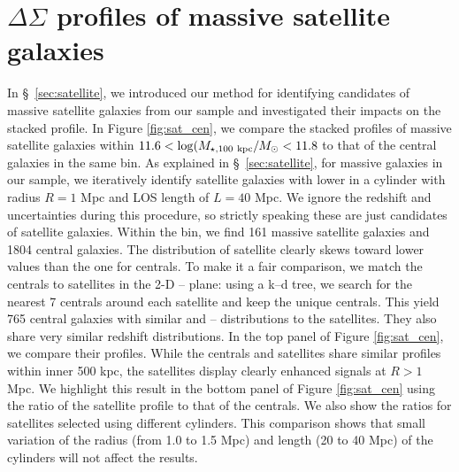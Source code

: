 \documentclass[fleqn,usenatbib,useAMS]{mnras}
\begin{document}
\section{\texorpdfstring{$\Delta\Sigma$}{DSigma} profiles of massive satellite galaxies}
	\label{app:sat_cen}

    In \S\ \ref{sec:satellite}, we introduced our method for identifying candidates of massive
    satellite galaxies from our sample and investigated their impacts on the stacked \dsigma{}
    profile.
    In Figure \ref{fig:sat_cen}, we compare the stacked \dsigma{} profiles of massive satellite
    galaxies within $11.6 < \log (M_{\star, 100\ \rm kpc}/M_{\odot} < 11.8$ to that of the central 
    galaxies in the same \mstar{} bin.
    As explained in \S\ \ref{sec:satellite}, for massive galaxies in our sample, we iteratively
    identify satellite galaxies with lower  in a cylinder with radius $R=1$ Mpc and LOS
    length of $L=40$ Mpc.
    We ignore the redshift and \mstar{} uncertainties during this procedure, so strictly speaking 
    these are just candidates of satellite galaxies.
    Within the  bin, we find 161 massive satellite galaxies and 1804 central galaxies.
    The  distribution of satellite clearly skews toward lower values than the one
    for centrals.
    To make it a fair comparison, we match the centrals to satellites in the 2-D 
    -- plane: using a k--d tree, we search for the nearest 7 centrals 
    around each satellite and keep the unique centrals.
    This yield 765 central galaxies with similar  and -- 
    distributions to the satellites. 
    They also share very similar redshift distributions.
    In the top panel of Figure \ref{fig:sat_cen}, we compare their \dsigma{} profiles.
    While the centrals and satellites share similar profiles within inner 500 kpc, the satellites 
    display clearly enhanced \dsigma{} signals at $R>1$ Mpc.
    We highlight this result in the bottom panel of Figure \ref{fig:sat_cen} using the ratio 
    of the satellite \dsigma{} profile to that of the centrals. 
    We also show the ratios for satellites selected using different cylinders. 
    This comparison shows that small variation of the radius (from 1.0 to 1.5 Mpc) and length
    (20 to 40 Mpc) of the cylinders will not affect the results.
\end{document}
